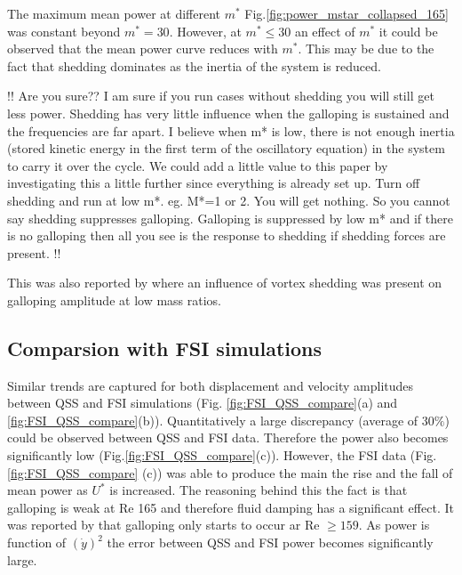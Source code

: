 

The maximum mean power at different $m^*$ Fig.\ref{fig:power_mstar_collapsed_165} was constant beyond $m^*=30$. However, at $m^* \leq 30$ an effect of $m^*$ it could be observed that the mean power curve reduces with $m^*$. This may be due to the fact that shedding dominates as the inertia of the system is reduced.  

!! Are you sure?? I am sure if you run cases without shedding you will still get less power. Shedding has very little influence when the galloping is sustained and the frequencies are far apart. I believe when m* is low, there is not enough inertia (stored kinetic energy in the first term of the oscillatory equation)  in the system to carry it over the cycle.
We could add a little value to this paper by investigating this a little further since everything is already set up. Turn off shedding and run at low m*. eg. M*=1 or 2. You will get nothing. So you cannot say shedding suppresses galloping. Galloping is suppressed by low m* and if there is no galloping then all you see is the response to shedding if shedding forces are present.
 !! 
 
 This was also reported by \cite{Joly2012} where an influence of vortex shedding was present on galloping amplitude at low mass ratios. 



 

\subsection{Comparsion with FSI simulations}
 Similar trends are captured for both displacement and velocity amplitudes between QSS and FSI simulations (Fig. \ref{fig:FSI_QSS_compare}(a) and \ref{fig:FSI_QSS_compare}(b)). Quantitatively a large discrepancy (average of $30\%$) could be observed between QSS and FSI data. Therefore the power also becomes significantly low (Fig.\ref{fig:FSI_QSS_compare}(c)). However, the FSI data (Fig.\ref{fig:FSI_QSS_compare} (c)) was able to produce the main the rise and the fall of mean power as $U^*$ is increased. The reasoning behind this the fact is that galloping is weak at Re 165  and therefore fluid damping has a significant effect. It was reported by \cite{Barrero-Gil2009} that galloping only starts to occur ar Re $\geq 159$. As power is function of $(\dot{y})^2$ the error between QSS and FSI power becomes significantly large.  
 
 
 










 

 
 
 

 
 



 
 
 
 
 
 
 
 
 
 
  
 
 